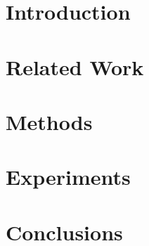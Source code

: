 \documentclass[letter,11pt]{article}
\theoremstyle{plain}
\theoremstyle{definition}
\theoremstyle{plain}
\theoremstyle{definition}
\begin{document}
	\pagebreak
	\label{abs_lbl}
	
	
	\section{Introduction}
	\label{intro_lbl}
	
	
	\section{Related Work}
	\label{related_lbl}
	
	
	\section{Methods}
	\label{methods_lbl}
	
	
	\section{Experiments}
	\label{experiments_lbl}
	
	
	\section{Conclusions}
	\label{conclusions_lbl}
	
		
	\label{references_lbl}
	
\end{document}
